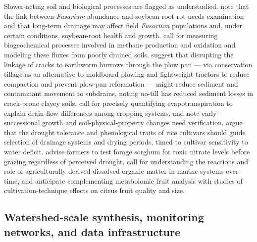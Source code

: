 \documentclass[11pt]{article}
\begin{document}
Slower-acting soil and biological processes are flagged as understudied. \textcite{Han2017} note that the link between \emph{Fusarium} abundance and soybean root rot needs examination and that long-term drainage may affect field \emph{Fusarium} populations and, under certain conditions, soybean-root health and growth. \textcite{Kumar2014b} call for measuring biogeochemical processes involved in methane production and oxidation and modeling these fluxes from poorly drained soils. \textcite{Shipitalo2004} suggest that disrupting the linkage of cracks to earthworm burrows through the plow pan --- via conservation tillage as an alternative to moldboard plowing and lightweight tractors to reduce compaction and prevent plow-pan reformation --- might reduce sediment and contaminant movement to subdrains, noting no-till has reduced sediment losses in crack-prone clayey soils. \textcite{Daigh2014} call for precisely quantifying evapotranspiration to explain drain-flow differences among cropping systems, and \textcite{Tian2012} note early-successional growth and soil-physical-property changes need verification. \textcite{DarziNaftchali2017b} argue that the drought tolerance and phenological traits of rice cultivars should guide selection of drainage systems and drying periods, timed to cultivar sensitivity to water deficit. \textcite{Nash2017} advise farmers to test forage sorghum for toxic nitrate levels before grazing regardless of perceived drought. \textcite{Manninen2018} call for understanding the reactions and role of agriculturally derived dissolved organic matter in marine systems over time, and \textcite{GiménezValero2024} anticipate complementing metabolomic fruit analysis with studies of cultivation-technique effects on citrus fruit quality and size.

\subsection{Watershed-scale synthesis, monitoring networks, and data infrastructure}
\end{document}
